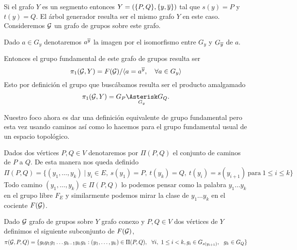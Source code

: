 \documentclass[tesis.tex]{subfiles}
\begin{document}
\begin{ej}\label{ej_pi1_segmento}
	
	Si el grafo $Y$ es un segmento entonces $Y = (\{ P,Q \}, \{ y, \overline y\})$ tal que $s(y) = P$ y $t(y) = Q$.
	El árbol generador resulta ser el mismo grafo $Y$ en este caso.
	Consideremos ${\cal G}$ un grafo de grupos sobre este grafo.
	\begin{center}
	\end{center}
	Dado $a \in G_{y}$ denotaremos $a^{\overline y}$ la imagen por el isomorfismo entre $G_{y}$ y $G_{\overline y}$ de $a$.
	
	Entonces el grupo fundamental de este grafo de grupos resulta ser 
	\[
		\pi_1({\cal G}, Y) =  F({\cal G}) / \langle a = a^{\overline y}, \quad \forall a \in G_{y} \rangle
	\]
	Esto por definición el grupo que buscábamos resulta ser el producto amalgamado
	\[
	\pi_1({\cal G}, Y) = G_P \underset{G_{y}}{\Asterisk} G_Q.
	\]
\end{ej}

Nuestro foco ahora es dar una definición equivalente de grupo fundamental pero esta vez usando caminos así como lo hacemos para el grupo fundamental usual de un espacio topológico.

\medskip
Dados dos vértices $P,Q \in V$ denotaremos por $\Pi(P,Q)$ el conjunto de caminos de $P$ a $Q$.
De esta manera nos queda definido
\[
\Pi(P,Q) = \{  (y_1, \dots, y_k) \ | \ y_{i} \in E, \ s(y_1)=P, \ t(y_k) = Q, \ t(y_i) = s(y_{i+1})  \ \text{para} \ 1 \le i \le k \}
\]
Todo camino $(y_1, \dots, y_k) \in \Pi(P,Q)$ lo podemos pensar como la palabra $y_1 \dots y_k$ en el grupo libre $F_E$ y similarmente podemos mirar la clase de $y_1\dots y_k$ en el cociente $F({\cal G})$.  

\begin{deff}
	Dado ${\cal G}$ grafo de grupos sobre $Y$ grafo conexo y $P,Q \in V$ dos vértices de $Y$ definimos el siguiente subconjunto de $F({\cal G})$,
	\begin{equation*}
		\pi(\cG, P, Q) = \{  g_0y_1g_1 \dots g_{k-1}y_kg_k : (y_1,\dots, y_k) \in \Pi(P,Q), \ \ 
		 \forall i, \ 1 \le i < k, g_i \in G_{s(y_{i+1})}, \ \ g_k \in G_Q \}	
	\end{equation*}
\end{deff}
 
\end{document}
